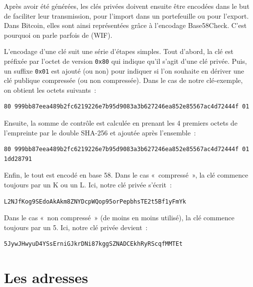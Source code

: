 Après avoir été générées, les clés privées doivent ensuite être encodées dans le but de faciliter leur transmission, pour l'import dans un portefeuille ou pour l'export. Dans Bitcoin, elles sont ainsi représentées grâce à l'encodage Base58Check. C'est pourquoi on parle parfois de  (WIF).

L'encodage d'une clé suit une série d'étapes simples. Tout d'abord, la clé est préfixée par l'octet de version \texttt{0x80} qui indique qu'il s'agit d'une clé privée. Puis, un suffixe \texttt{0x01} est ajouté (ou non) pour indiquer si l'on souhaite en dériver une clé publique compressée (ou non compressée). Dans le cas de notre clé-exemple, on obtient les octets suivants~:

\begin{Verbatim}[fontsize=\scriptsize]
80 999bb87eea489b2fc6219226e7b95d9083a3b627246ea852e85567ac4d72444f 01
\end{Verbatim}

Ensuite, la somme de contrôle est calculée en prenant les 4 premiers octets de l'empreinte par le double SHA-256 et ajoutée après l'ensemble~:


\begin{Verbatim}[fontsize=\scriptsize]
80 999bb87eea489b2fc6219226e7b95d9083a3b627246ea852e85567ac4d72444f 01
1dd28791
\end{Verbatim}

Enfin, le tout est encodé en base 58. Dans le cas «~compressé~», la clé commence toujours par un K ou un L. Ici, notre clé privée s'écrit~:

\begin{Verbatim}[fontsize=\small]
L2NJfKog9SEdoAkAkm8ZNYDcpWQop95orPepbhsTE2t5Bf1yFmYk
\end{Verbatim}

Dans le cas «~non compressé~» (de moins en moins utilisé), la clé commence toujours par un 5. Ici, notre clé privée devient~:

\begin{Verbatim}[fontsize=\small]
5JywJHwyuD4YSsErniGJkrDNi87kggSZNADCEkhRyRScqfMMTEt
\end{Verbatim}

\section*{Les adresses}

